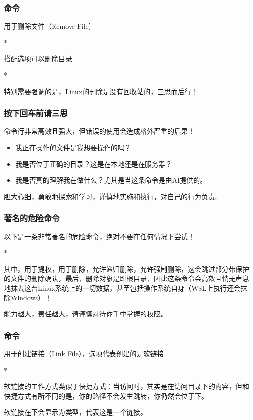 \begin{frame}
    \frametitle{命令}
    用于删除文件（Remove File）
    \begin{Code}*
        
    \end{Code}
    搭配选项可以删除目录
    \begin{Code}*
        
    \end{Code}
    特别需要强调的是，Linux的删除是没有回收站的，三思而后行！
\end{frame}

\begin{frame}
    \frametitle{按下回车前请三思}
    命令行非常高效且强大，但错误的使用会造成格外严重的后果！
    \begin{itemize}
        \item 我正在操作的文件是我想要操作的吗？
        \item 我是否位于正确的目录？这是在本地还是在服务器？
        \item 我是否真的理解我在做什么？尤其是当这条命令是由AI提供的。
    \end{itemize}
    胆大心细，勇敢地探索和学习，谨慎地实施和执行，\alert{对自己的行为负责}。
\end{frame}

\begin{frame}
    \frametitle{著名的危险命令}
    以下是一条非常著名的危险命令，\alert{绝对不要在任何情况下尝试！}
    \begin{Code}*
        
    \end{Code}
    其中，用于提权，用于删除，允许递归删除，允许强制删除，这会跳过部分带保护的文件的删除确认，最后，删除对象是\code{/}即根目录，因此这条命令会高效且悄无声息地抹去这台Linux系统上的一切数据，甚至包括操作系统自身（WSL上执行还会抹除Windows）！

    \alert{能力越大，责任越大}，请谨慎对待你手中掌握的权限。
\end{frame}

\begin{frame}
    \frametitle{命令}
    用于创建链接（Link File），选项代表创建的是软链接
    \begin{Code}*
        
    \end{Code}
    软链接的工作方式类似于快捷方式：当访问时，其实是在访问目录下的内容，但和快捷方式有所不同的是，你的路径不会发生跳转，你仍然会位于下。

    软链接在下会显示为类型，代表这是一个链接。
\end{frame}

